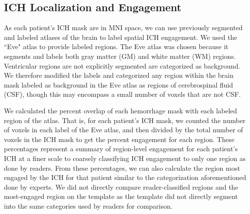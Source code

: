 \documentclass[10pt]{article}\usepackage[]{graphicx}\usepackage[]{color}
\begin{document}
\subsection*{ICH Localization and Engagement}
\label{sec:engage}
As each patient's ICH mask are in MNI space, we can use previously segmented and labeled atlases of the brain to label spatial ICH engagement.  
We used the ``Eve" atlas \citep{oishi_human_2008} to provide labeled regions. The Eve atlas was chosen because it segments and labels both gray matter (GM) and white matter (WM) regions.  Ventricular regions are not explicitly segmented are categorized as background.  We therefore modified the labels and categorized any region within the brain mask labeled as background in the Eve atlas as regions of cerebrospinal fluid (CSF), though this may encompass a small number of voxels that are not CSF.  

We calculated the percent overlap of each hemorrhage mask with each labeled region of the atlas.  That is, for each patient's ICH mask, we counted the number of voxels in each label of the Eve atlas, and then divided by the total number of voxels in the ICH mask to get the percent engagement for each region. These percentages represent a summary of region-level engagement for each patient's ICH at a finer scale to coarsely classifying ICH engagement to only one region as done by readers.  From these percentages, we can also calculate the region most engaged by the ICH for that patient similar to the categorization aforementioned done by experts.  We did not directly compare reader-classified regions and the most-engaged region on the template as the template did not directly segment into the same categories used by readers for comparison.
\end{document}
